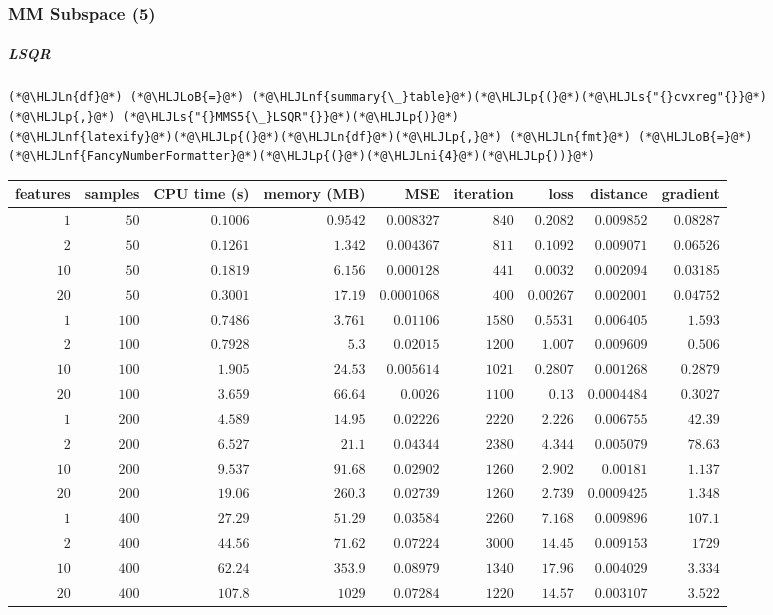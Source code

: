\documentclass[12pt,a4paper]{article}
\newcommand{\HLJLn}[1]{#1}
\newcommand{\HLJLnf}[1]{\textcolor[RGB]{66,102,213}{#1}}
\newcommand{\HLJLs}[1]{\textcolor[RGB]{201,61,57}{#1}}
\newcommand{\HLJLni}[1]{\textcolor[RGB]{59,151,46}{#1}}
\newcommand{\HLJLoB}[1]{\textcolor[RGB]{102,102,102}{\textbf{#1}}}
\newcommand{\HLJLp}[1]{#1}
\begin{document}
\subsubsection{MM Subspace (5)}
\subparagraph{LSQR}

\begin{lstlisting}
(*@\HLJLn{df}@*) (*@\HLJLoB{=}@*) (*@\HLJLnf{summary{\_}table}@*)(*@\HLJLp{(}@*)(*@\HLJLs{"{}cvxreg"{}}@*)(*@\HLJLp{,}@*) (*@\HLJLs{"{}MMS5{\_}LSQR"{}}@*)(*@\HLJLp{)}@*)
(*@\HLJLnf{latexify}@*)(*@\HLJLp{(}@*)(*@\HLJLn{df}@*)(*@\HLJLp{,}@*) (*@\HLJLn{fmt}@*) (*@\HLJLoB{=}@*) (*@\HLJLnf{FancyNumberFormatter}@*)(*@\HLJLp{(}@*)(*@\HLJLni{4}@*)(*@\HLJLp{))}@*)
\end{lstlisting}


\begin{tabular}
{r | r | r | r | r | r | r | r | r}
features & samples & CPU time (s) & memory (MB) & MSE & iteration & loss & distance & gradient \\
\hline
$1$ & $50$ & $0.1006$ & $0.9542$ & $0.008327$ & $840$ & $0.2082$ & $0.009852$ & $0.08287$ \\
$2$ & $50$ & $0.1261$ & $1.342$ & $0.004367$ & $811$ & $0.1092$ & $0.009071$ & $0.06526$ \\
$10$ & $50$ & $0.1819$ & $6.156$ & $0.000128$ & $441$ & $0.0032$ & $0.002094$ & $0.03185$ \\
$20$ & $50$ & $0.3001$ & $17.19$ & $0.0001068$ & $400$ & $0.00267$ & $0.002001$ & $0.04752$ \\
$1$ & $100$ & $0.7486$ & $3.761$ & $0.01106$ & $1580$ & $0.5531$ & $0.006405$ & $1.593$ \\
$2$ & $100$ & $0.7928$ & $5.3$ & $0.02015$ & $1200$ & $1.007$ & $0.009609$ & $0.506$ \\
$10$ & $100$ & $1.905$ & $24.53$ & $0.005614$ & $1021$ & $0.2807$ & $0.001268$ & $0.2879$ \\
$20$ & $100$ & $3.659$ & $66.64$ & $0.0026$ & $1100$ & $0.13$ & $0.0004484$ & $0.3027$ \\
$1$ & $200$ & $4.589$ & $14.95$ & $0.02226$ & $2220$ & $2.226$ & $0.006755$ & $42.39$ \\
$2$ & $200$ & $6.527$ & $21.1$ & $0.04344$ & $2380$ & $4.344$ & $0.005079$ & $78.63$ \\
$10$ & $200$ & $9.537$ & $91.68$ & $0.02902$ & $1260$ & $2.902$ & $0.00181$ & $1.137$ \\
$20$ & $200$ & $19.06$ & $260.3$ & $0.02739$ & $1260$ & $2.739$ & $0.0009425$ & $1.348$ \\
$1$ & $400$ & $27.29$ & $51.29$ & $0.03584$ & $2260$ & $7.168$ & $0.009896$ & $107.1$ \\
$2$ & $400$ & $44.56$ & $71.62$ & $0.07224$ & $3000$ & $14.45$ & $0.009153$ & $1729$ \\
$10$ & $400$ & $62.24$ & $353.9$ & $0.08979$ & $1340$ & $17.96$ & $0.004029$ & $3.334$ \\
$20$ & $400$ & $107.8$ & $1029$ & $0.07284$ & $1220$ & $14.57$ & $0.003107$ & $3.522$ \\
\end{tabular}
\end{document}
